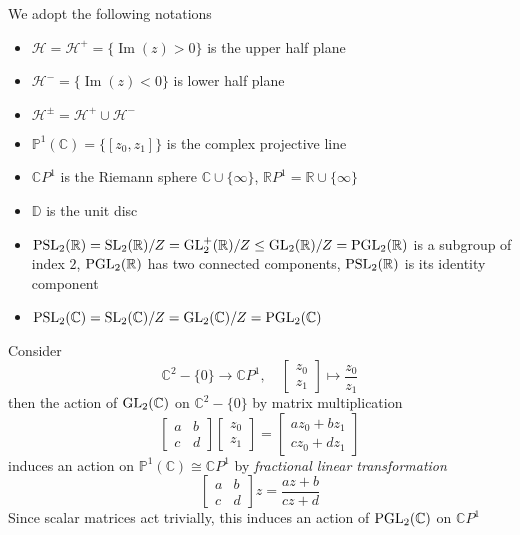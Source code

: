 \documentclass[main.tex]{subfiles}
\begin{document}
\begin{definition}
We adopt the following notations
\begin{itemize}
\item $\mathcal H=\mathcal H^+=\{\operatorname{Im}(z)>0\}$ is the upper half plane
\item $\mathcal H^-=\{\operatorname{Im}(z)<0\}$ is lower half plane
\item $\mathcal H^\pm=\mathcal H^+\cup\mathcal H^-$
\item $\mathbb P^1(\mathbb C)=\{[z_0,z_1]\}$ is the complex projective line
\item $\mathbb CP^1$ is the Riemann sphere $\mathbb C\cup\{\infty\}$, $\mathbb RP^1=\mathbb R\cup\{\infty\}$
\item $\mathbb D$ is the unit disc
\end{itemize}
\end{definition}

\begin{remark}\hfill
\begin{itemize}
\item $\operatorname{PSL}_2(\mathbb R)=\operatorname{SL}_2(\mathbb R)/Z=\operatorname{GL}^+_2(\mathbb R)/Z\leq\operatorname{GL}_2(\mathbb R)/Z=\operatorname{PGL}_2(\mathbb R)$ is a subgroup of index $2$, $\operatorname{PGL}_2(\mathbb R)$ has two connected components, $\operatorname{PSL}_2(\mathbb R)$ is its identity component
\item $\operatorname{PSL}_2(\mathbb C)=\operatorname{SL}_2(\mathbb C)/Z=\operatorname{GL}_2(\mathbb C)/Z=\operatorname{PGL}_2(\mathbb C)$
\end{itemize}
\end{remark}

\begin{definition}
Consider
\[\mathbb C^2-\{0\}\to\mathbb CP^1,\quad\begin{bmatrix}
z_0 \\
z_1
\end{bmatrix}\mapsto\dfrac{z_0}{z_1}\]
then the action of $\operatorname{GL}_2(\mathbb C)$ on $\mathbb C^2-\{0\}$ by matrix multiplication
\[
\begin{bmatrix}
a&b \\
c&d
\end{bmatrix}\begin{bmatrix}
z_0 \\
z_1
\end{bmatrix}=\begin{bmatrix}
az_0+bz_1 \\
cz_0+dz_1
\end{bmatrix}
\]
induces an action on $\mathbb P^1(\mathbb C)\cong\mathbb CP^1$ by \textit{fractional linear transformation}
\[
\begin{bmatrix}
a&b \\
c&d
\end{bmatrix}z=\frac{az+b}{cz+d}
\]
Since scalar matrices act trivially, this induces an action of $\operatorname{PGL}_2(\mathbb C)$ on $\mathbb CP^1$
\end{definition}
\end{document}
